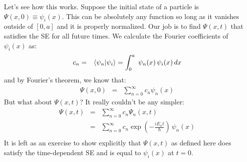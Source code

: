 \documentclass[12pt]{book}
\begin{document}
Let's see how this works.  Suppose the initial state of a particle is $\Psi(x,0) \equiv \psi_i(x)$.  This can be absolutely any function so long as it vanishes outside of $[0,a]$ and it is properly normalized.  Our job is to find $\Psi(x,t)$ that satisfies the SE for all future times.  We calculate the Fourier coefficients of $\psi_i(x)$ as:
\begin{eqnarray*}
c_n &=& \braket{\psi_n| \psi_i} = \int_{0}^{a} \; \psi_n(x) \, \psi_i(x) \, dx \\
\end{eqnarray*}
and by Fourier's theorem, we know that:
\begin{eqnarray*}
\Psi(x,0) &=& \sum_{n=0}^{\infty} c_n \psi_n(x)
\end{eqnarray*}
But what about $\Psi(x,t)$?  It really couldn't be any simpler:
\begin{eqnarray*}
\Psi(x,t) &=& \sum_{n=0}^{\infty} c_n \Psi_n(x,t)\\
          &=& \sum_{n=0}^{\infty} c_n \exp(-\frac{i E_n t}{\hbar}) \, \psi_n(x)\\
\end{eqnarray*}
It is left as an exercise to show explicitly that $\Psi(x,t)$ as defined here does satisfy the time-dependent SE and is equal to $\psi_i(x)$ at $t=0$. 
\end{document}
